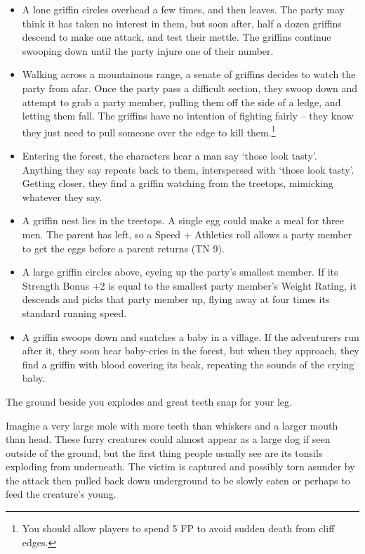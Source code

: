 \begin{multicols}{2}
\begin{itemize}
  \item
  A lone griffin circles overhead a few times, and then leaves.
  The party may think it has taken no interest in them, but soon after, half a dozen griffins descend to make one attack, and test their mettle.
  The griffins continue swooping down until the party injure one of their number.
  \item
  Walking across a mountainous range, a senate of griffins decides to watch the party from afar.
  Once the party pass a difficult section, they swoop down and attempt to grab a party member, pulling them off the side of a ledge, and letting them fall.
  The griffins have no intention of fighting fairly -- they know they just need to pull someone over the edge to kill them.\footnote{You should allow players to spend 5 FP to avoid sudden death from cliff edges.}
  \item
  Entering the forest, the characters hear a man say `those look tasty'.
  Anything they say repeats back to them, interspersed with `those look tasty'.
  Getting closer, they find a griffin watching from the treetops, mimicking whatever they say.
  \item
  A griffin nest lies in the treetops.
  A single egg could make a meal for three men.
  The parent has left, so a Speed + Athletics roll allows a party member to get the eggs before a parent returns (TN 9).
  \item
  A large griffin circles above, eyeing up the party's smallest member.
  If its Strength Bonus +2 is equal to the smallest party member's Weight Rating, it descends and picks that party member up, flying away at four times its standard running speed.
  \item
  A griffin swoops down and snatches a baby in a village.
  If the adventurers run after it, they soon hear baby-cries in the forest, but when they approach, they find a griffin with blood covering its beak, repeating the sounds of the crying baby.

\end{itemize}

\label{mouthdigger}

\begin{boxtext}

  The ground beside you explodes and great teeth snap for your leg.

\end{boxtext}

Imagine a very large mole with more teeth than whiskers and a larger mouth than head.
These furry creatures could almost appear as a large dog if seen outside of the ground, but the first thing people usually see are its tonsils exploding from underneath.
The victim is captured and possibly torn asunder by the attack then pulled back down underground to be slowly eaten or perhaps to feed the creature's young.


\end{multicols}

